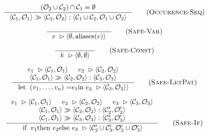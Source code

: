 \begin{figure}

\begin{equation*}
\inference{
  (\mathcal{O}_{2} \cup \mathcal{C}_{2}) \cap \mathcal{C}_{1} = \emptyset
}{
  \seqOccurences
  {\langle\mathcal{C}_{1},\mathcal{O}_{1}\rangle}
  {\langle\mathcal{C}_{2},\mathcal{O}_{2}\rangle}
  {\langle\mathcal{C}_{1}\cup\mathcal{C}_{2},\mathcal{O}_{1}\cup\mathcal{O}_{2}\rangle}
}\tagsc{Occurence-Seq}
\end{equation*}


\begin{equation*}
\inference{
}{
\inPlaceSafe{v}{\emptyset}{\aliases{v}}
}
\tagsc{Safe-Var}
\end{equation*}

\begin{equation*}
\inference{
}{
\inPlaceSafe{k}{\emptyset}{\emptyset}
}
\tagsc{Safe-Const}
\end{equation*}

\begin{equation*}
\inference{
  \inPlaceSafe{e_{1}}{\mathcal{C}_{1}}{\mathcal{O}_{1}}
  &
  \inPlaceSafe{e_{2}}{\mathcal{C}_{2}}{\mathcal{O}_{2}}
  \\
  \seqOccurences
  {\langle\mathcal{C}_{1},\mathcal{O}_{1}\rangle}
  {\langle\mathcal{C}_{2},\mathcal{O}_{2}\rangle}
  {\langle\mathcal{C}_{3},\mathcal{O}_{3}\rangle}
}{
  \inPlaceSafe{\text{\lstinline[mathescape]!let ($v_{1}, \ldots, v_{n}$) = $e_{1}$ in\ $e_{2}$!}}
  {\mathcal{C}_{3}}{\mathcal{O}_{3}\rangle}
}
\tagsc{Safe-LetPat}
\end{equation*}

\begin{equation*}
\inference{
  \inPlaceSafe{v_{1}}{\mathcal{C}_{1}}{\mathcal{O}_{1}}
  &
  \inPlaceSafe{e_{2}}{\mathcal{C}_{2}}{\mathcal{O}_{2}}
  &
  \inPlaceSafe{e_{3}}{\mathcal{C}_{3}}{\mathcal{O}_{3}}
  \\
  \seqOccurences
  {\langle\mathcal{C}_{1},\mathcal{O}_{1}\rangle}
  {\langle\mathcal{C}_{2},\mathcal{O}_{2}\rangle}
  {\langle\mathcal{C}_{2}',\mathcal{O}_{2}'\rangle}
  \\
  \seqOccurences
  {\langle\mathcal{C}_{1},\mathcal{O}_{1}\rangle}
  {\langle\mathcal{C}_{3},\mathcal{O}_{3}\rangle}
  {\langle\mathcal{C}_{3}',\mathcal{O}_{3}'\rangle}
}{
  \inPlaceSafe{\text{\lstinline[mathescape]!if\ $v_{1}$ then\ $e_{2}$ else\ $e_{3}$!}}
  {\mathcal{C}'_{2}\cup\mathcal{C}'_{3}}
  {\mathcal{O}'_{2}\cup\mathcal{O}'_{3}}
}
\tagsc{Safe-If}
\end{equation*}


\end{figure}
